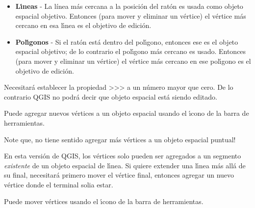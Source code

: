 \begin{itemize}
\item \textbf{L\'{\i}neas}    - La l{\'i}nea más cercana a la posici\'on del rat\'on
                          es usada como objeto espacial objetivo.
                          Entonces (para mover y eliminar un v\'ertice)
                          el v\'ertice más cercano
                          en esa l\'{\i}nea es el objetivo de edici\'on.

\item \textbf{Pol\'{\i}gonos} - Si el rat\'on est\'a dentro del pol\'{\i}gono, entonces ese
                          es el objeto espacial objetivo; de lo contrario el pol\'{\i}gono más cercano
                          es usado.
                          Entonces (para mover y eliminar un v\'ertice)
                          el v\'ertice más cercano
                          en ese pol\'{\i}gono es el objetivo de edici\'on.                          
\end{itemize}

Necesitar\'a establecer la propiedad
>>>
a un n\'umero mayor que cero.  De lo contrario QGIS no podr\'a decir que objeto espacial est\'a siendo editado.



Puede agregar nuevos v\'ertices a un objeto espacial usando el \'{\i}cono
de la barra de herramientas.

Note que, no tiene sentido agregar más v\'ertices a un objeto espacial puntual!

En esta versi\'on de QGIS, los v\'ertices solo pueden ser agregados a un segmento \textit{existente} 
de un objeto espacial de l\'{\i}nea.  Si quiere extender una l\'{\i}nea más all\'a de su final,
necesitar\'a primero mover el v\'ertice final, entonces agregar un nuevo v\'ertice donde
el terminal solia estar.


Puede mover v\'ertices usando el \'{\i}cono 
de la barra de herramientas.


